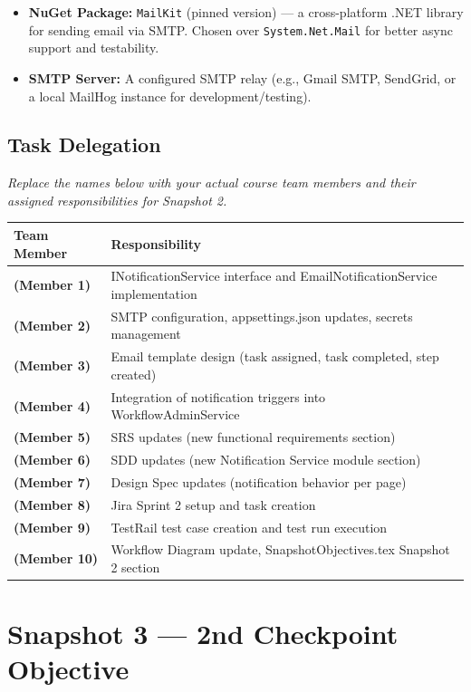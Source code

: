 \documentclass[12pt]{article}
\begin{document}
\begin{itemize}
    \item \textbf{NuGet Package:} \texttt{MailKit} (pinned version) --- a cross-platform
    .NET library for sending email via SMTP. Chosen over \texttt{System.Net.Mail} for
    better async support and testability.
    \item \textbf{SMTP Server:} A configured SMTP relay (e.g., Gmail SMTP, SendGrid, or a
    local MailHog instance for development/testing).
\end{itemize}

\subsection{Task Delegation}

\textit{Replace the names below with your actual course team members and their assigned
responsibilities for Snapshot 2.}

\begin{center}
\begin{tabular}{>{\bfseries}p{4cm} p{9cm}}
\toprule
Team Member & Responsibility \\
\midrule
(Member 1) & INotificationService interface and EmailNotificationService implementation \\
(Member 2) & SMTP configuration, appsettings.json updates, secrets management \\
(Member 3) & Email template design (task assigned, task completed, step created) \\
(Member 4) & Integration of notification triggers into WorkflowAdminService \\
(Member 5) & SRS updates (new functional requirements section) \\
(Member 6) & SDD updates (new Notification Service module section) \\
(Member 7) & Design Spec updates (notification behavior per page) \\
(Member 8) & Jira Sprint 2 setup and task creation \\
(Member 9) & TestRail test case creation and test run execution \\
(Member 10) & Workflow Diagram update, SnapshotObjectives.tex Snapshot 2 section \\
\bottomrule
\end{tabular}
\end{center}

\section{Snapshot 3 — 2nd Checkpoint Objective}
\end{document}
